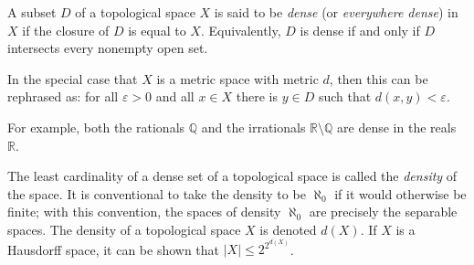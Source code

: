 \documentclass{article}
\begin{document}
A subset $D$ of a topological space $X$
is said to be \emph{dense} (or \emph{everywhere dense}) in $X$
if the closure of $D$ is equal to $X$.
Equivalently, $D$ is dense if and only if
$D$ intersects every nonempty open set.

In the special case that $X$ is a metric space with metric $d$,
then this can be rephrased as:
for all $\varepsilon > 0$ and all $x\in X$
there is $y\in D$ such that $d(x,y)<\varepsilon$.

For example, both the rationals $\mathbb{Q}$
and the irrationals $\mathbb{R} \setminus \mathbb{Q}$
are dense in the reals $\mathbb{R}$.

The least cardinality of a dense set of a topological space
is called the \emph{density} of the space.
It is conventional to take the density to be $\aleph_0$
if it would otherwise be finite;
with this convention,
the spaces of density $\aleph_0$ are precisely the separable spaces.
The density of a topological space $X$ is denoted $d(X)$.
If $X$ is a Hausdorff space,
it can be shown that $|X| \le 2^{2^{d(X)}}$.
\end{document}
